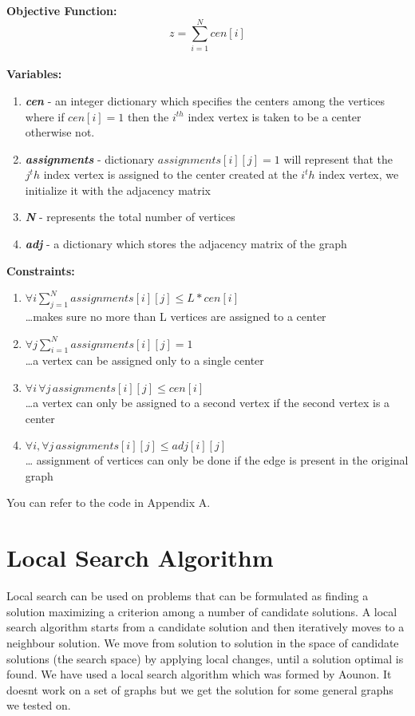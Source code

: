 \documentclass[12pt,a4paper,onecolumn]{article}
\begin{document}
\textbf{Objective Function:}\\
\hspace{15mm} $$z=\sum_{i=1}^{N}cen[i]$$
\\
\textbf{Variables:}\begin{enumerate}
\item \textit{\textbf{cen}} - an integer dictionary which specifies the centers among the vertices
where if $cen[i]=1$ then the $i^{th}$ index vertex is taken to be a center otherwise not.\item \textit{\textbf{assignments}} - dictionary $assignments[i][j]=1$ will represent that the $j^th$ index vertex is assigned to the center created at the $i^th$ index vertex, we initialize it with the adjacency matrix
\item \textit{\textbf{N}} - represents the total number of vertices
\item \textit{\textbf{adj}} - a dictionary which stores the adjacency matrix of the graph 
\end{enumerate}
\textbf{Constraints:}
\begin{enumerate}
\item $\forall i \sum_{j=1}^{N}assignments[i][j]\leq L*cen[i]$\\\hspace{1cm}\ldots makes sure no more than L vertices are assigned to a center
\item $\forall j \sum_{i=1}^{N}assignments[i][j] = 1$\\\hspace{1cm}\ldots a vertex can be assigned only to a single center
\item $\forall i \, \forall j \, assignments[i][j] \leq cen[i]$\\\hspace{1cm}\ldots a vertex can only be assigned to a second vertex if the second vertex is a center
\item $\forall i , \forall j \, assignments[i][j] \leq adj[i][j]$\\\hspace{1cm}\ldots 
assignment of vertices can only be done if the edge is present in the original graph

\end{enumerate}

You can refer to the code in Appendix A.

\section{Local Search Algorithm}
Local search can be used on problems that can be formulated as finding a solution maximizing a criterion among a number of candidate solutions.
A local search algorithm starts from a candidate solution and then iteratively moves to a neighbour solution. We move from solution to solution in the space of candidate solutions (the search space) by applying local changes, until a solution optimal is found.
We have used a local search algorithm which was formed by Aounon. It doesnt work on a set of graphs but we get the solution for some general graphs we tested on.
\end{document}
